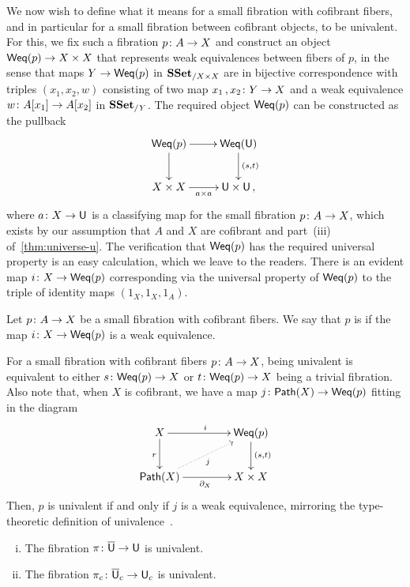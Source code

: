 \documentclass[reqno,10pt,a4paper,oneside,draft]{amsart}
\begin{document}
We now wish to define  what it means for a small fibration with cofibrant fibers, and in particular for a small fibration between cofibrant objects, to  be univalent. For this, we fix such a fibration $p \colon A \to X$ and construct an object $\mathsf{Weq}(p) \to X \times X$ that represents weak
equivalences between fibers of $p$, in the sense that maps $Y \to \mathsf{Weq}(p)$ in $\mathbf{SSet}_{/X \times X}$ are in bijective correspondence with triples $(x_1, x_2, w)$ consisting of two map $x_1 \, , x_2 \colon Y \to X$ and a weak equivalence $w \colon A[x_1]
\to A[x_2]$ in $\mathbf{SSet}_{/Y}$. The required object $\mathsf{Weq}(p)$ can be constructed as the pullback
\[
\xymatrix{
\Weq(p) \ar[r] \ar[d] & \Weq(\U) \ar[d]^{(s,t)} \\
X \times X \ar[r]_{a \times a} & \U \times \U \, ,}
\]
where $a \colon X \to \mathsf{U}$ is a classifying map for the small fibration $p \colon A \to X$, which exists by our assumption
that $A$ and $X$ are cofibrant and part~(iii) of~\cref{thm:universe-u}. The verification that $\mathsf{Weq}(p)$
has the required universal property is an easy calculation, which we leave to the readers. There is an
evident map $i \colon X \to \mathsf{Weq}(p)$ corresponding via the universal property of $\mathsf{Weq}(p)$ to the triple of identity maps $(1_X, 1_X, 1_A)$.




\begin{definition}  \label{equ:characterisations-of-univalence} Let $p \colon A \to X$ be a small fibration with cofibrant fibers. We say that $p$ is  if the map $i \colon X \to \mathsf{Weq}(p)$ is a weak equivalence. 
\end{definition}

\smallskip

For a small fibration with cofibrant fibers $p \colon A \to X$, being univalent is equivalent to
either $s \colon \mathsf{Weq}(p) \to X$ or $t \colon \mathsf{Weq}(p) \to X$ being a trivial fibration.  Also note that, when $X$
is cofibrant, we have a map $j \colon \mathsf{Path}(X) \to \mathsf{Weq}(p)$ fitting in the diagram
\[
\xymatrix@C=1.5cm{
X \ar[r]^i \ar[d]_r & \Weq(p) \ar[d]^{(s,t)} \\
\Path(X) \ar[r]_{\partial_X}  \ar@{.>}[ur]_{j} &  X \times X }
\]
Then, $p$ is univalent if and only if $j$ is a weak equivalence, mirroring the type-theoretic
definition of univalence~\cite{hottbook}.





\begin{theorem}  \label{thm:univalence-of-u-and-uc} \hfill 
\begin{enumerate}[(i)]
\item The fibration $\pi \colon \overline{\mathsf{U}} \to \mathsf{U}$ is univalent.
\item The fibration $\pi_c \colon \overline{\mathsf{U}}_c \to \mathsf{U}_c$ is univalent.
\end{enumerate}
\end{theorem}
\end{document}
